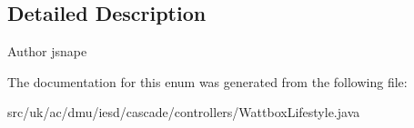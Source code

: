 \subsection{Detailed Description}
\begin{DoxyAuthor}{Author}
jsnape 
\end{DoxyAuthor}


The documentation for this enum was generated from the following file\-:\begin{DoxyCompactItemize}
\item 
src/uk/ac/dmu/iesd/cascade/controllers/Wattbox\-Lifestyle.\-java\end{DoxyCompactItemize}
